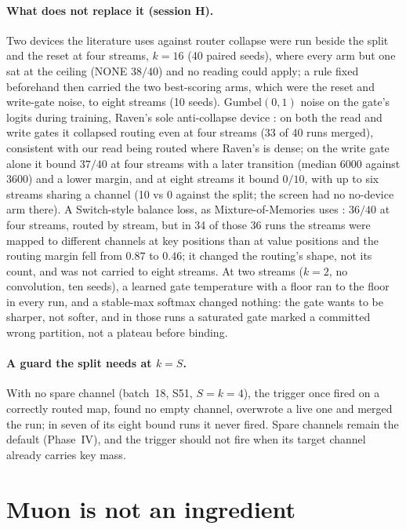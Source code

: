 \documentclass[11pt]{article}
\begin{document}
\paragraph{What does not replace it (session H).} Two devices the literature uses against router collapse were run beside the split and the reset at four streams, $k = 16$ (40 paired seeds), where every arm but one sat at the ceiling (NONE $38/40$) and no reading could apply; a rule fixed beforehand then carried the two best-scoring arms, which were the reset and write-gate noise, to eight streams (10 seeds). Gumbel$(0,1)$ noise on the gate's logits during training, Raven's sole anti-collapse device \cite{raven}: on both the read and write gates it collapsed routing even at four streams (33 of 40 runs merged), consistent with our read being routed where Raven's is dense; on the write gate alone it bound $37/40$ at four streams with a later transition (median 6000 against 3600) and a lower margin, and at eight streams it bound $0/10$, with up to six streams sharing a channel (10 vs 0 against the split; the screen had no no-device arm there). A Switch-style balance loss, as Mixture-of-Memories uses \cite{mom, switch}: $36/40$ at four streams, routed by stream, but in 34 of those 36 runs the streams were mapped to different channels at key positions than at value positions and the routing margin fell from $0.87$ to $0.46$; it changed the routing's shape, not its count, and was not carried to eight streams. At two streams ($k = 2$, no convolution, ten seeds), a learned gate temperature with a floor ran to the floor in every run, and a stable-max softmax changed nothing: the gate wants to be sharper, not softer, and in those runs a saturated gate marked a committed wrong partition, not a plateau before binding.

\paragraph{A guard the split needs at $k = S$.} With no spare channel (batch~18, S51, $S = k = 4$), the trigger once fired on a correctly routed map, found no empty channel, overwrote a live one and merged the run; in seven of its eight bound runs it never fired. Spare channels remain the default (Phase~IV), and the trigger should not fire when its target channel already carries key mass.

\section{Muon is not an ingredient}
\label{sec:muon}
\end{document}
